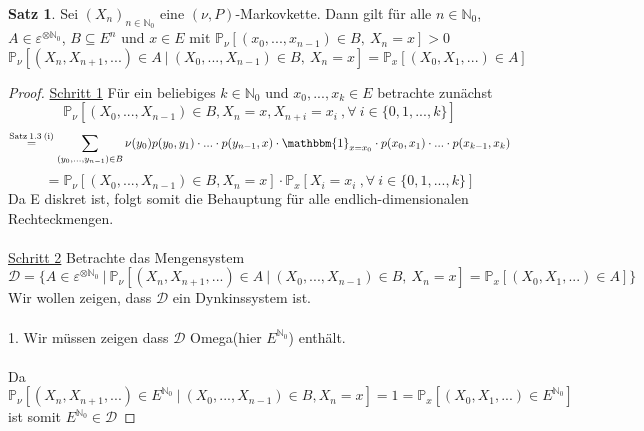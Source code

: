 \documentclass[a4paper,12pt]{scrartcl}
\theoremstyle{definition}
\newtheorem{sat}{Satz}[section]
\begin{document}
\begin{sat}
\label{vorangegangene und zukünftige Ereignisse}
Sei $(X_{n})_{n \in \mathbb{N}_{0}}$  eine $(\nu,P)$-Markovkette. Dann gilt für alle $n \in \mathbb{N}_{0}$, $A \in \varepsilon^{ \otimes \mathbb{N}_{0}}$, $B \subseteq E^{n}$ und $x \in E$ mit $\mathbb{P}_{\nu}[(x_{0},...,x_{n-1}) \in B, \: X_{n} = x]>0$
\begin{equation*}
\mathbb{P}_{\nu}[(X_{n},X_{n+1},...) \in A \: | \: (X_{0},...,X_{n-1})  \in B, \: X_{n} = x] = \mathbb{P}_{x}[(X_{0},X_{1},...) \in A] 
\end{equation*}
\end{sat}
\begin{proof}
\underline{Schritt 1} Für ein beliebiges $k \in \mathbb{N}_{0}$ und $x_{0},...,x_{k} \in E$ betrachte zunächst 
\begin{equation*}
\mathbb{P}_{\nu}[(X_{0},...,X_{n-1}) \in B ,  X_{n} = x, X_{n+i} = x_{i} \: , \forall \: i \in \lbrace 0,1,...,k \rbrace]
\end{equation*}
\begin{equation*}
\stackrel{\mathrm{Satz \: 1.3 \: (i)}}{=} \sum_{(y_{0},...,y_{n-1}) \in B} \nu(y_{0})p(y_{0},y_{1}) \cdot ... \cdot p(y_{n-1},x) \cdot \mathbbm{1}_{ x = x_{0}} \cdot p(x_{0},x_{1})  \cdot ... \cdot p(x_{k-1},x_{k})
\end{equation*}
\begin{equation*}
= \mathbb{P}_{\nu}[(X_{0},...,X_{n-1}) \in B, X_{n} = x] \cdot  \mathbb{P}_{x}[X_{i} = x_{i} \: , \forall \: i \in \lbrace 0,1,...,k \rbrace]
\end{equation*}
Da E diskret ist, folgt somit die Behauptung für alle endlich-dimensionalen Rechteckmengen.
\\
\\
\underline{Schritt 2} Betrachte das Mengensystem
\begin{equation*}
\mathcal{D} = \lbrace A \in \varepsilon^{ \otimes \mathbb{N}_{0}} \: | \: \mathbb{P}_{\nu}[(X_{n},X_{n+1},...) \in A \: | \: (X_{0},...,X_{n-1})  \in B, \: X_{n} = x] = \mathbb{P}_{x}[(X_{0},X_{1},...) \in A] \rbrace
\end{equation*}
Wir wollen zeigen, dass $\mathcal{D}$ ein Dynkinssystem ist.
\\
\\
1. Wir müssen zeigen dass $\mathcal{D}$ Omega(hier $E^{\mathbb{N}_{0}}$) enthält.
\\
\\
Da $\mathbb{P}_{\nu}[(X_{n},X_{n+1},...) \in E^{\mathbb{N}_{0}}  \: | \: (X_{0},...,X_{n-1})  \in B, X_{n} = x] = 1 = \mathbb{P}_{x}[(X_{0},X_{1},...) \in E^{\mathbb{N}_{0}}]$ ist somit $E^{\mathbb{N}_{0}} \in \mathcal{D}$ 

\end{proof}
\end{document}
